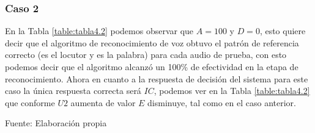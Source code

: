 \subsubsection{Caso 2}
En la Tabla \ref{table:tabla4.2} podemos observar que $A = 100$ y $D = 0$, esto quiere decir que el algoritmo de reconocimiento de voz obtuvo el patrón de referencia correcto (es el locutor y es la palabra) para cada audio de prueba, con esto podemos decir que el algoritmo alcanzó un 100\% de efectividad en la etapa de reconocimiento.
\vskip 0.5cm
Ahora en cuanto a la respuesta de decisión del sistema para este caso la única respuesta correcta será $IC$, podemos ver en la Tabla \ref{table:tabla4.2} que conforme $U2$ aumenta de valor $E$ disminuye, tal como en el caso anterior.

\begin{center}
\begin{table}[H]
\centering
\caption{\small{Resultados para obtener U2 en el caso 2.}}
\label{table:tabla4.2}
\vskip 0.2cm
\begin{center}
\vskip 0.2cm
{\small{Fuente: Elaboración propia}}
\end{center}
\end{table}
\end{center}

